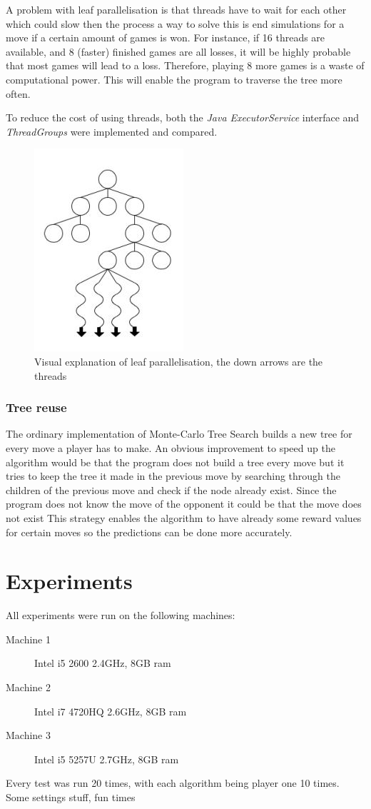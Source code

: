 \documentclass{ba-kecs}
\begin{document}
A problem with leaf parallelisation is that threads have to wait for each other which could slow then the process a way to solve this is end simulations for a move if a certain amount of games is won. For instance, if 16 threads are available, and 8 (faster) finished games are all losses, it will be highly probable that most games
will lead to a loss. Therefore, playing 8 more games is a waste of computational power. This will enable the program to traverse the tree more often.\cite{chaslot2008parallel}

To reduce the cost of using threads, both the \textit{Java ExecutorService} interface and \textit{ThreadGroups} were implemented and compared.
\begin{figure}
	\centering
	\includegraphics[]{figure_leafparallisation}
		\caption{Visual explanation of leaf parallelisation, the down arrows are the threads \cite{chaslot2008parallel}}
		\label{fig:leaf}
\end{figure}


\subsubsection{Tree reuse}
The ordinary implementation of Monte-Carlo Tree Search builds a new tree for every move a player has to make. An obvious improvement to speed up the algorithm would be that the program does not build a tree every move but it tries to keep the tree it made in the previous move by searching through the children of the previous move and check if the node already exist. Since the program does not know the move of the opponent it could be that the move does not exist This strategy enables the algorithm to have already some reward values for certain moves so the predictions can be done more accurately.

\section{Experiments}
All experiments were run on the following machines:
\begin{description}
\item[Machine 1] Intel i5 2600 2.4GHz, 8GB ram
\item[Machine 2] Intel i7 4720HQ 2.6GHz, 8GB ram
\item[Machine 3] Intel i5 5257U 2.7GHz, 8GB ram
\end{description}
Every test was run 20 times, with each algorithm being player one 10 times.\\ Some settings stuff, fun times
\end{document}
